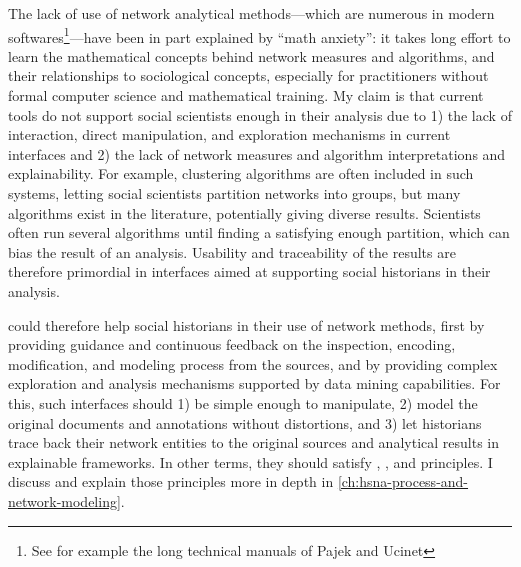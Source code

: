 The lack of use of network analytical methods---which are numerous in modern \sna softwares\footnote{See for example the long technical manuals of Pajek\cite{pajek} and Ucinet\cite{johnsonUCINETSoftwareTool1987}}---have been in part explained by ``math anxiety''\cite{paxtonDollarsSenseConvincing2006}: it takes long effort to learn the mathematical concepts behind network measures and algorithms, and their relationships to sociological concepts\cite{rollingerProlegomenaProblemsPerspectives2020}, especially for practitioners without formal computer science and mathematical training.
My claim is that current \hsna tools do not support social scientists enough in their analysis due to 1) the lack of interaction, direct manipulation, and exploration mechanisms in current interfaces and 2) the lack of network measures and algorithm interpretations and explainability.
For example, clustering algorithms are often included in such systems, letting social scientists partition networks into groups, but many algorithms exist in the literature, potentially giving diverse results.
Scientists often run several algorithms until finding a satisfying enough partition, which can bias the result of an analysis\cite{pisterIntegratingPriorKnowledge2021}.
Usability and traceability of the results are therefore primordial in \va interfaces aimed at supporting social historians in their analysis.

\va could therefore help social historians in their use of network methods, first by providing guidance and continuous feedback on the inspection, encoding, modification, and modeling process from the sources, and by providing complex exploration and analysis mechanisms supported by data mining capabilities.
For this, such interfaces should 1) be simple enough to manipulate, 2) model the original documents and annotations without distortions, and 3) let historians trace back their network entities to the original sources and analytical results in explainable frameworks.
In other terms, they should satisfy \simplicity, \reality, and \traceability principles.
I discuss and explain those principles more in depth in \autoref{ch:hsna-process-and-network-modeling}.



